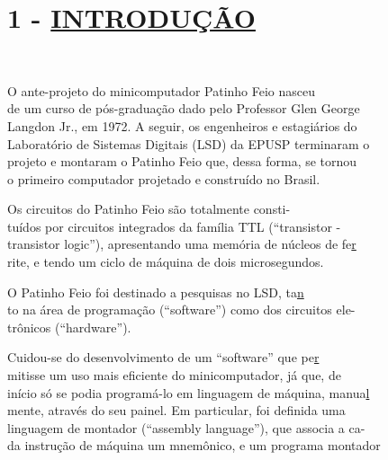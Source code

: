 \documentclass[a4paper,12pt]{article}
\begin{document}
\setcounter{page}{1}
\setcounter{section}{1}

\section*{1 - \uline{INTRODUÇÃO}}

\noindent \\
\par
O ante-projeto do minicomputador Patinho Feio nasceu\\
de um curso de pós-graduação dado pelo Professor Glen \hfill George\\
Langdon Jr., em 1972. A seguir, os engenheiros e estagiários do\\
Laboratório de Sistemas Digitais (LSD) da EPUSP terminaram \hfill o\\
projeto e montaram o Patinho Feio que, dessa forma, se \hfill tornou\\
o primeiro computador projetado e construído no Brasil.\\
\par
Os circuitos do Patinho Feio são totalmente \hfill consti-\\
tuídos por circuitos integrados da família TTL (``transistor \hfill -\\
transistor logic''), apresentando uma memória de núcleos de fe\uline r\\
rite, e tendo um ciclo de máquina de dois microsegundos.\\
\par
O Patinho Feio foi destinado a pesquisas no LSD, ta\uline n\\
to na área de programação (``software'') como dos circuitos ele-\\
trônicos (``hardware'').\\
\par
Cuidou-se do desenvolvimento de um ``software'' que pe\uline r\\
mitisse um uso mais eficiente do minicomputador, já que, \hfill de\\
início só se podia programá-lo em linguagem de máquina, manua\uline l\\
mente, através do seu painel. Em particular, foi definida \hfill uma\\
linguagem de montador (``assembly language''), que associa a ca-\\
da instrução de máquina um mnemônico, e um programa \hfill montador\\
\end{document}
